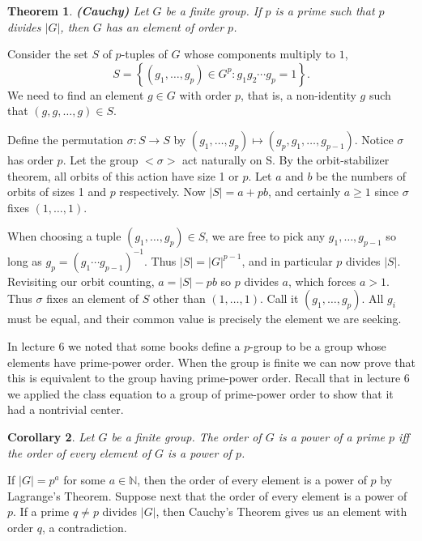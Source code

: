 \documentclass[letterpaper]{article}
\newtheorem{theorem}{Theorem}[section]
\newtheorem{corollary}[theorem]{Corollary}
\newenvironment{proof}[1][Proof]{\begin{trivlist}
\item[\hskip \labelsep {\bfseries #1}]}{\end{trivlist}}
\begin{document}
\begin{theorem}
\emph{\textbf{(Cauchy)}}
Let $G$ be a finite group. If $p$ is a prime such that $p$ divides
$|G|$, then $G$ has an element of order $p$.
\end{theorem}
\begin{proof}
Consider the set $S$ of $p$-tuples of $G$ whose components multiply
to $1$, \[S = \left\{ (g_1, \dots, g_p) \in G^p\colon g_1 g_2\cdots
g_p = 1 \right\}.\] We need to find an element $g \in G$ with order
$p$, that is, a non-identity $g$ such that $(g, g, \ldots, g) \in
S$.

Define the permutation $\sigma\colon S \rightarrow S$ by $(g_1,
\dots, g_p) \mapsto (g_p, g_1, \dots, g_{p-1})$. Notice $\sigma$
has order $p$. Let the group ${<}\sigma{>}$ act naturally on S. By
the orbit-stabilizer theorem, all orbits of this action have size
1 or $p$. Let $a$ and $b$ be the numbers of orbits of sizes 1 and
$p$  respectively. Now $|S| = a + pb$, and certainly $a \geq 1$
since $\sigma$ fixes $(1, \ldots, 1)$.

When choosing a tuple $(g_1, \ldots, g_p) \in S$, we are free to
pick any $g_1, \ldots, g_{p-1}$ so long as $g_p = (g_1 \cdots
g_{p-1})^{-1}$. Thus $|S| = |G|^{p-1}$, and in particular $p$ divides
$|S|$. Revisiting our orbit counting, $a = |S| - pb$ so $p$ divides
$a$, which forces $a > 1$. Thus $\sigma$  fixes an element of $S$
other than $(1, \ldots, 1)$. Call it $(g_1, \ldots, g_p)$. All $g_i$
must be equal, and their common value is precisely the element we
are seeking.
\end{proof}

In lecture 6 we noted that some books define a $p$-group to be a
group whose elements have prime-power order. When the group is
finite we can now prove that this is equivalent to the group having
prime-power order. Recall that in lecture 6 we applied the class
equation to a group of prime-power order to show that it had a
nontrivial center.

\begin{corollary}
Let $G$ be a finite group. The order of $G$ is a power of a prime
$p$ iff the order of every element of $G$ is a power of $p$.
\end{corollary}
\begin{proof}
If $|G|=p^a$ for some $a \in \mathbb{N}$, then the order of every
element is a power of $p$ by Lagrange's Theorem. Suppose next that
the order of every element is a power of $p$. If a prime $q \neq
p$ divides $|G|$, then Cauchy's Theorem gives us an element with
order $q$, a contradiction.
\end{proof}
\end{document}
